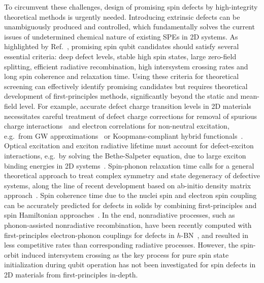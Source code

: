 To circumvent these challenges, design of promising spin defects by high-integrity theoretical methods is urgently needed.
Introducing extrinsic defects can be unambiguously produced and controlled, which fundamentally solves the current issues of undetermined chemical nature of existing SPEs in 2D systems.
As highlighted by Ref.~\cite{weber2010quantum,ivady2018first}, promising spin qubit candidates should satisfy several essential criteria: deep defect levels, stable high spin states, large zero-field splitting, efficient radiative recombination, high intersystem crossing rates and long spin coherence and relaxation time.
Using these criteria for theoretical screening can effectively identify promising candidates but
requires theoretical development of first-principles methods, significantly beyond the static and mean-field level. For example, accurate defect charge transition levels in 2D materials necessitates careful treatment of defect charge corrections for removal of spurious charge interactions~\cite{komsa2014charged,komsa2018erratum,wang2015determination,wu2017first} and electron correlations for non-neutral excitation, e.g.\ from GW approximations~\cite{wu2017first,govoni2015large} or Koopmans-compliant hybrid functionals~\cite{smart2018fundamental,nguyen2018koopmans,weng2018wannier,miceli2018nonempirical}. Optical excitation and exciton radiative lifetime must account for defect-exciton interactions, e.g.\ by solving the Bethe-Salpeter equation, due to large exciton binding energies in 2D systems~\cite{refaely2018defect,gao2020radiative}.  Spin-phonon relaxation time calls for a general theoretical approach to treat complex symmetry and state degeneracy of defective systems, along the line of recent development based on
ab-initio density matrix approach~\cite{xu2020spin}.
Spin coherence time due to the nuclei spin and electron spin coupling
can be accurately predicted for defects in solids by combining first-principles and spin Hamiltonian approaches~\cite{seo2016quantum,ye2019spin}. In the end, nonradiative processes, such as phonon-assisted nonradiative recombination, have been recently computed with first-principles electron-phonon couplings for defects in $h$-BN~\cite{wu2019carrier}, and resulted in less competitive rates than corresponding radiative processes. However, the spin-orbit induced intersystem crossing as the key process for pure spin state initialization during qubit operation has not been investigated for spin defects in 2D materials from first-principles in-depth.


